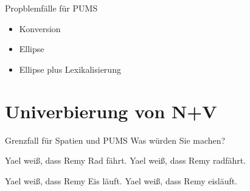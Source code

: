 \begin{frame}
  {Propblemfälle für PUMS}
  \pause
  \begin{exe}
    \ex
    \begin{xlist}
      \pause
      \pause
    \end{xlist}
    \Viertelzeile
    \pause
    \ex
    \begin{xlist}
      \pause
      \pause
    \end{xlist}
    \pause
    \Viertelzeile
    \ex
    \begin{xlist}
      \pause
    \end{xlist}
  \end{exe}
  \pause
  \begin{itemize}[<+->]
    \item Konversion
    \item Ellipse
    \item Ellipse plus Lexikalisierung
  \end{itemize}
\end{frame}

\section{Univerbierung von N+V}

\newcommand{\exhl}[1]{\alert{#1}}

\begin{frame}
  {Grenzfall für Spatien und PUMS}
  Was würden Sie machen?\\
  \Zeile
  \begin{exe}
  \ex\label{ex:introexamples1}
  \begin{xlist}
    \ex Yael weiß, dass Remy \exhl{Rad} \exhl{fährt}.
    \ex Yael weiß, dass Remy \exhl{radfährt}.
  \end{xlist}
  \Zeile
  \ex
  \begin{xlist}
    \ex Yael weiß, dass Remy \exhl{Eis} \exhl{läuft}.
    \ex Yael weiß, dass Remy \exhl{eisläuft}.
  \end{xlist}
\end{exe}
\end{frame}

